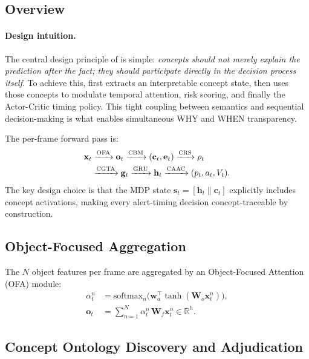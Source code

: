 \subsection{Overview}

\paragraph{Design intuition.}
The central design principle of \method{} is simple:
\emph{concepts should not merely explain the prediction after the fact;
they should participate directly in the decision process itself}.
To achieve this, \method{} first extracts an interpretable concept state,
then uses those concepts to modulate temporal attention, risk scoring,
and finally the Actor-Critic timing policy.
This tight coupling between semantics and sequential decision-making
is what enables simultaneous WHY and WHEN transparency.

The per-frame forward pass is:
\begin{align*}
  \mathbf{x}_t
  &\xrightarrow{\text{OFA}} \mathbf{o}_t
  \xrightarrow{\textsc{CBM}} (\mathbf{c}_t,\mathbf{e}_t)
  \xrightarrow{\textsc{CRS}} \rho_t \\
  &\xrightarrow{\textsc{CGTA}} \mathbf{g}_t
  \xrightarrow{\text{GRU}} \mathbf{h}_t
  \xrightarrow{\textsc{CAAC}} (p_t, a_t, V_t).
\end{align*}
The key design choice is that the \caac{} MDP state
$\mathbf{s}_t = [\mathbf{h}_t \| \mathbf{c}_t]$ explicitly includes
concept activations, making every alert-timing decision concept-traceable
by construction.

\subsection{Object-Focused Aggregation}

The $N$ object features per frame are aggregated by an Object-Focused
Attention (OFA) module:
\begin{align}
  \alpha^n_t &= \mathrm{softmax}_n\bigl(\mathbf{w}_a^\top
    \tanh(\mathbf{W}_o \mathbf{x}^n_t)\bigr), \\
  \mathbf{o}_t &= \sum_{n=1}^N \alpha^n_t\,\mathbf{W}_f \mathbf{x}^n_t
    \in \mathbb{R}^h.
\end{align}

\subsection{Concept Ontology Discovery and Adjudication}

